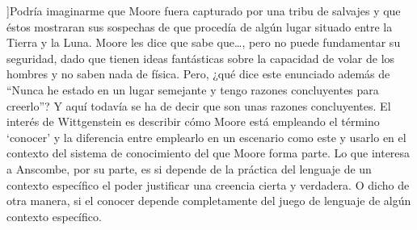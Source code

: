 ]{Podría imaginarme que Moore fuera capturado por una tribu de salvajes y que éstos mostraran sus sospechas de que procedía de algún lugar situado entre la Tierra y la Luna. Moore les dice que sabe que\ldots, pero no puede fundamentar su seguridad, dado que tienen ideas fantásticas sobre la capacidad de volar de los hombres y no saben nada de física. \textelp{} Pero, ¿qué dice este enunciado además de ``Nunca he estado en un lugar semejante y tengo razones concluyentes para creerlo''? Y aquí todavía se ha de decir que son unas razones concluyentes}.  El interés de Wittgenstein es describir cómo Moore está empleando el término `conocer' y la diferencia entre emplearlo en un escenario como este y usarlo en el contexto del sistema de conocimiento del que Moore forma parte. Lo que interesa a Anscombe, por su parte, es si depende de la práctica del lenguaje de un contexto específico el poder justificar una creencia cierta y verdadera. O dicho de otra manera, si el conocer depende completamente del juego de lenguaje de algún contexto específico.


